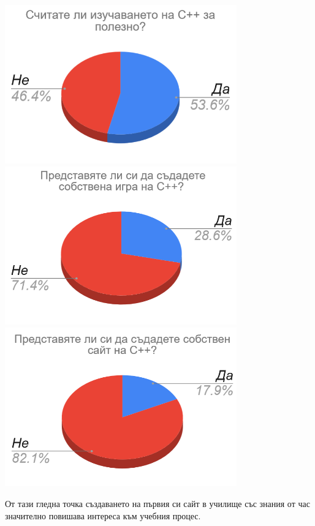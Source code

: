 \documentclass[documentation.tex]{subfiles}
\begin{document}
    \begin{center}
        \includegraphics[width=0.75\textwidth]{images/learning.png}\\
        \includegraphics[width=0.75\textwidth]{images/games.png}\\
        \includegraphics[width=0.75\textwidth]{images/web.png}\\
    \end{center}
    \begin{text} \par
        От тази гледна точка създаването на първия си сайт в училище със знания от час значително повишава интереса към учебния процес.
    \end{text}
\end{document}
